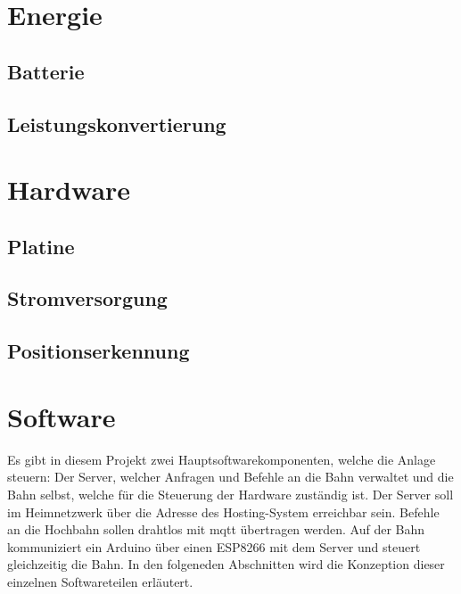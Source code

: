 \section{Energie}
\subsection{Batterie}
\subsection{Leistungskonvertierung}

\section{Hardware}
\subsection{Platine}
\subsection{Stromversorgung}
\subsection{Positionserkennung}

\section{Software}
Es gibt in diesem Projekt zwei Hauptsoftwarekomponenten, welche die Anlage steuern: Der Server, welcher Anfragen und Befehle an die Bahn verwaltet und die Bahn selbst,
welche für die Steuerung der Hardware zuständig ist. Der Server soll im Heimnetzwerk über die Adresse des Hosting-System erreichbar sein. Befehle an die Hochbahn sollen drahtlos mit \acrshort{mqtt} übertragen werden.
Auf der Bahn kommuniziert ein Arduino über einen ESP8266 mit dem Server und steuert gleichzeitig die Bahn. In den folgeneden Abschnitten wird die Konzeption dieser einzelnen Softwareteilen erläutert.

